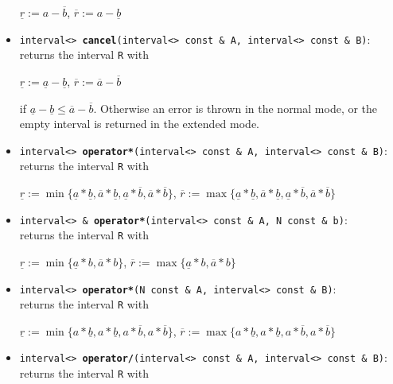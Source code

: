 \documentclass{report}
\begin{document}
\begin{itemize}
\begin{center}
				$\underline{r} := {a}-\overline{b}$,
				$\overline{r} := {a}-\underline{b}$
			\end{center}	
		\item
			\texttt{interval<> {\bf cancel}(interval<> const \& A, interval<> const \& B)}:\\returns the interval \texttt{R} with
						\begin{center}
				$\underline{r} := \underline{a}-\underline{b}$,
				$\overline{r} := \overline{a}-\overline{b}$
			\end{center}
			if $\underline{a}-\underline{b} \leq \overline{a}-\overline{b}$.
			Otherwise an error is thrown in the normal
		mode, or the empty interval is returned in the extended mode.
	
		\item
 	\texttt{interval<> {\bf operator*}(interval<> const \& A, interval<> const \& B)}:\\returns the interval \texttt{R} with
						\begin{center}
				$\underline{r} := \min\{\underline{a}*\underline{b},\overline{a}*\underline{b},\underline{a}*\overline{b},\overline{a}*\overline{b}\}$,
				$\overline{r} := \max\{\underline{a}*\underline{b},\overline{a}*\underline{b},\underline{a}*\overline{b},\overline{a}*\overline{b}\}$
			\end{center}
		\item
			\texttt{interval<> \& {\bf operator*}(interval<> const \& A, N const \& b)}:\\returns the interval \texttt{R} with
						\begin{center}
				$\underline{r} := \min\{\underline{a}*b,\overline{a}*b\}$,
				$\overline{r}  := \max\{\underline{a}*b,\overline{a}*b\}$
			\end{center}
	\item
 	\texttt{interval<> {\bf operator*}(N const \& A, interval<> const \& B)}:\\returns the interval \texttt{R} with
						\begin{center}
				$\underline{r} := \min\{{a}*\underline{b},{a}*\underline{b},a*\overline{b},{a}*\overline{b}\}$,
				$\overline{r} := \max\{{a}*\underline{b},{a}*\underline{b},{a}*\overline{b},{a}*\overline{b}\}$
			\end{center}	
	\item
			\texttt{interval<> {\bf operator/}(interval<> const \& A, interval<> const \& B)}:\\returns the interval \texttt{R} with
						\begin{center}

\end{center}
\end{itemize}
\end{document}

